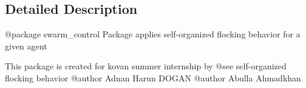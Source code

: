 \subsection{Detailed Description}
\begin{DoxyVerb}@package swarm_control
Package applies self-organized flocking behavior for a given agent

This package is created for kovan summer internship by
@see self-organized flocking behavior
@author Adnan Harun DOGAN
@author Abulla Ahmadkhan
\end{DoxyVerb}
 